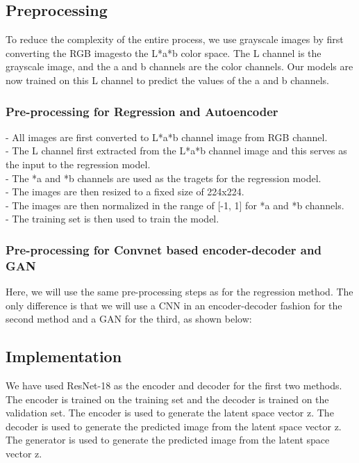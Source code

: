 \documentclass{article}
\begin{document}
\subsection{Preprocessing}
To reduce the complexity of the entire process, we use grayscale images by first converting the RGB imagesto the L*a*b color space.
The L channel is the grayscale image, and the a and b channels are the color channels.
Our models are now trained on this L channel to predict the values of the a and b channels.

\subsubsection{Pre-processing for Regression and Autoencoder}
    - All images are first converted to L*a*b channel image from RGB channel. \\
    - The L channel first extracted from the L*a*b channel image and this serves as the input to the regression model. \\
    - The *a and *b channels are used as the tragets for the regression model. \\
    - The images are then resized to a fixed size of 224x224. \\
    - The images are then normalized in the range of [-1, 1] for *a and *b channels. \\
    - The training set is then used to train the model. \\

\subsubsection{Pre-processing for Convnet based encoder-decoder and GAN}
Here, we will use the same pre-processing steps as for the regression method. 
The only difference is that we will use a CNN in an encoder-decoder fashion for the second method and a GAN for the third, as shown below:

\subsection{Implementation}
We have used ResNet-18 as the encoder and decoder for the first two methods. 
The encoder is trained on the training set and the decoder is trained on the validation set.
The encoder is used to generate the latent space vector z.
The decoder is used to generate the predicted image from the latent space vector z.
The generator is used to generate the predicted image from the latent space vector z.
\end{document}
